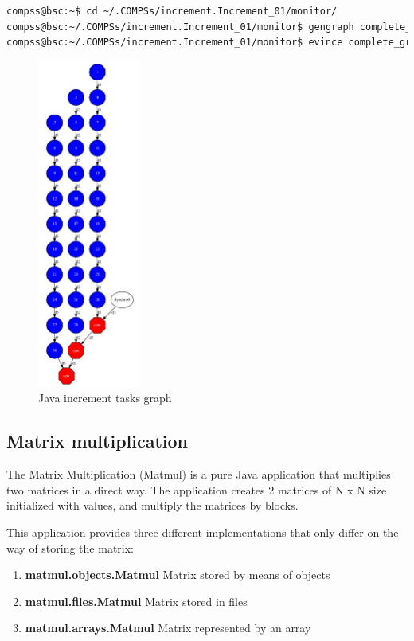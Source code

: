 \begin{lstlisting}[language=bash]
compss@bsc:~$ cd ~/.COMPSs/increment.Increment_01/monitor/
compss@bsc:~/.COMPSs/increment.Increment_01/monitor$ gengraph complete_graph.dot
compss@bsc:~/.COMPSs/increment.Increment_01/monitor$ evince complete_graph.pdf
\end{lstlisting}

\begin{figure}[ht!]
  \centering
    \includegraphics[width=0.3\textwidth]{./Sections/2_Java/Figures/increment_graph.jpeg}
    \caption{Java increment tasks graph} 
    \label{fig:increment_java}
\end{figure}

\newpage
\subsection{Matrix multiplication}
The Matrix Multiplication (Matmul) is a pure Java application that multiplies two matrices in a direct way. 
The application creates 2 matrices of N x N size initialized with values, and multiply the matrices by blocks.

This application provides three different implementations that only differ on the way of storing the matrix:
\begin{enumerate}
 \item \textbf{matmul.objects.Matmul} Matrix stored by means of objects
 \item \textbf{matmul.files.Matmul} Matrix stored in files
 \item \textbf{matmul.arrays.Matmul} Matrix represented by an array
\end{enumerate}

